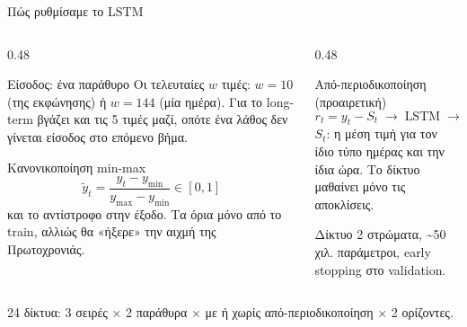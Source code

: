 \documentclass[aspectratio=169,10pt]{beamer}
\begin{document}
\begin{frame}{Πώς ρυθμίσαμε το LSTM}
  \small
  \begin{columns}[T, onlytextwidth]
    \begin{column}{0.48\textwidth}
      \begin{block}{Είσοδος: ένα παράθυρο}
        Οι τελευταίες $w$ τιμές: $w = 10$ (της εκφώνησης) ή $w = 144$ (μία ημέρα). Για το long-term βγάζει \alert{και τις 5 τιμές μαζί}, οπότε ένα λάθος δεν γίνεται είσοδος στο επόμενο βήμα.
      \end{block}
      \begin{block}{Κανονικοποίηση min-max}
        \[ \tilde y_t = \frac{y_t - y_{\min}}{y_{\max} - y_{\min}} \in [0, 1] \]
        και το αντίστροφο στην έξοδο. Τα όρια \alert{μόνο από το train}, αλλιώς θα «ήξερε» την αιχμή της Πρωτοχρονιάς.
      \end{block}
    \end{column}
    \begin{column}{0.48\textwidth}
      \begin{block}{Από-περιοδικοποίηση (προαιρετική)}
        \[ r_t = y_t - S_t \;\longrightarrow\; \text{LSTM} \;\longrightarrow\; \hat y_t = \hat r_t + S_t \]
        $S_t$: η μέση τιμή για τον ίδιο τύπο ημέρας και την ίδια ώρα. Το δίκτυο μαθαίνει μόνο τις αποκλίσεις.
      \end{block}
      \begin{block}{Δίκτυο}
        2 στρώματα, \textasciitilde 50 χιλ. παράμετροι, early stopping στο validation.
      \end{block}
    \end{column}
  \end{columns}
  \vspace{0.3em}
  \alert{24 δίκτυα}: 3 σειρές × 2 παράθυρα × με ή χωρίς από-περιοδικοποίηση × 2 ορίζοντες.
\end{frame}
\end{document}
